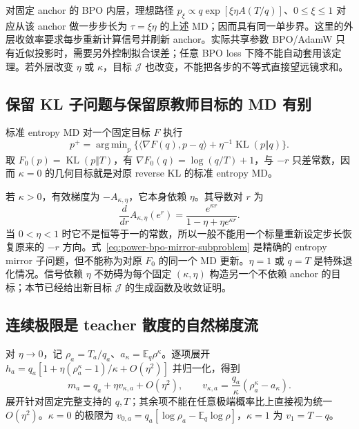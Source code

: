 \documentclass[lang=cn,scheme=chinese,openany]{../book/elegantbook}
\newcommand{\E}{\mathbb E}
\newcommand{\KL}{\operatorname{KL}}
\DeclareMathOperator*{\argmin}{arg\,min}
\begin{document}
对固定 anchor 的 BPO 内层，理想路径 $p_\xi\propto q\exp[\xi\eta A(T/q)]$、$0\le\xi\le1$ 对应从该 anchor 做一步步长为 $\tau=\xi\eta$ 的上述 MD；因而具有同一单步界。这里的外层收敛率要求每步重新计算信号并刷新 anchor。实际共享参数 BPO/AdamW 只有近似投影时，需要另外控制拟合误差；任意 BPO loss 下降不能自动套用该定理。若外层改变 $\eta$ 或 $\kappa$，目标 $\mathcal J$ 也改变，不能把各步的不等式直接望远镜求和。



\subsection{保留 KL 子问题与保留原教师目标的 MD 有别}

标准 entropy MD 对一个固定目标 $F$ 执行
\begin{equation}
 p^+=\argmin_p\{\langle\nabla F(q),p-q\rangle+\eta^{-1}\KL(p\Vert q)\}.
\end{equation}
取 $F_0(p)=\KL(p\Vert T)$，有 $\nabla F_0(q)=\log(q/T)+1$，与 $-r$ 只差常数，因而 $\kappa=0$ 的几何目标就是对原 reverse KL 的标准 entropy MD。

若 $\kappa>0$，有效梯度为 $-A_{\kappa,\eta}$，它本身依赖 $\eta$。其导数对 $r$ 为
\begin{equation}
 \frac{d}{dr}A_{\kappa,\eta}(e^r)=\frac{e^{\kappa r}}{1-\eta+\eta e^{\kappa r}}.
\end{equation}
当 $0<\eta<1$ 时它不是恒等于一的常数，所以一般不能用一个标量重新设定步长恢复原来的 $-r$ 方向。式~\eqref{eq:power-bpo-mirror-subproblem} 是精确的 entropy mirror 子问题，但不能称为对原 $F_0$ 的同一个 MD 更新。$\eta=1$ 或 $q=T$ 是特殊退化情况。信号依赖 $\eta$ 不妨碍为每个固定 $(\kappa,\eta)$ 构造另一个不依赖 anchor 的目标；本节已经给出新目标 $\mathcal J$ 的生成函数及收敛证明。

\subsection{连续极限是 teacher 散度的自然梯度流}

对 $\eta\to0$，记 $\rho_a=T_a/q_a$、$a_\kappa=\E_q\rho^\kappa$。逐项展开 $h_a=q_a[1+\eta(\rho_a^\kappa-1)/\kappa+O(\eta^2)]$ 并归一化，得到
\begin{equation}
 m_a=q_a+\eta v_{\kappa,a}+O(\eta^2),\qquad
 v_{\kappa,a}=\frac{q_a}{\kappa}(\rho_a^\kappa-a_\kappa).
 \label{eq:proximal-natural-velocity}
\end{equation}
展开针对固定完整支持的 $q,T$；其余项不能在任意极端概率比上直接视为统一 $O(\eta^2)$。$\kappa=0$ 的极限为 $v_{0,a}=q_a[\log\rho_a-\E_q\log\rho]$，$\kappa=1$ 为 $v_1=T-q$。
\end{document}
